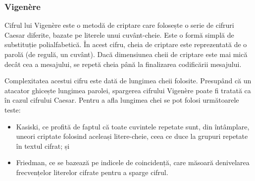 \documentclass{article}
\begin{document}
\subsubsection{Vigenère}

Cifrul lui Vigenère este o metodă de criptare care folosește o serie de cifruri Caesar diferite, bazate pe literele unui cuvânt-cheie. Este o formă simplă de substituție polialfabetică. În acest cifru, cheia de criptare este reprezentată de o parolă (de regulă, un cuvânt). Dacă dimensiunea cheii de criptare este mai mică decât cea a mesajului, se repetă cheia până la finalizarea codificării mesajului.

\vspace{0.3cm}
\begin{center}
    \label{fig:2}
    \captionsetup{justification=centering,margin=1cm}
\end{center}
\vspace{0.3cm}

\begin{center}
    \label{fig:2}
    \captionsetup{justification=centering,margin=1cm}
\end{center}
\vspace{0.3cm}

Complexitatea acestui cifru este dată de lungimea cheii folosite. Presupând că un atacator ghicește lungimea parolei, spargerea cifrului Vigenère poate fi tratată ca în cazul cifrului Caesar. Pentru a afla lungimea chei se pot folosi următoarele teste:
\begin{itemize}
    \item Kasiski, ce profită de faptul că toate cuvintele repetate sunt, din întâmplare, uneori criptate folosind aceleași litere-cheie, ceea ce duce la grupuri repetate în textul cifrat; și
    \item Friedman, ce se bazează pe indicele de coincidență, care măsoară denivelarea frecvențelor literelor cifrate pentru a sparge cifrul.
\end{itemize}
\end{document}
